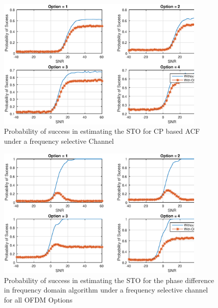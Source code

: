 \begin{figure}[hbt]
  \centering
    \includegraphics[width=0.9\textwidth]
      {./figures/p_sucess_sto_acf_chn_all}
  \caption{Probability of success in estimating the STO for CP based ACF under a frequency selective Channel}
  \label{fig:sto_esti_cp_acf_chn}
\end{figure}



\begin{figure}[hbt]
  \centering
    \includegraphics[width=0.9\textwidth]
      {./figures/p_sucess_sto_freq_all}
  \caption{Probability of success in estimating the STO for the phase difference in frequency domain algorithm under a frequency selective channel for all OFDM Options}
  \label{fig:sto_esti_ph_diff_chn}
\end{figure}


